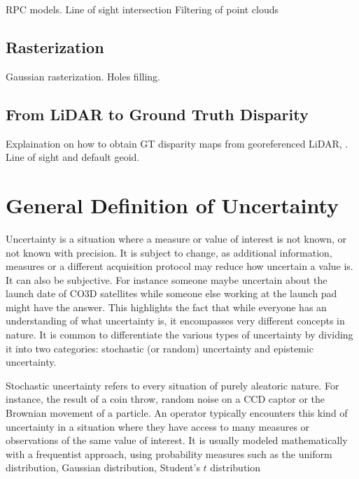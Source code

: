 RPC models. Line of sight intersection
Filtering of point clouds

\subsection{Rasterization}
Gaussian rasterization. Holes filling.  

\subsection{From LiDAR to Ground Truth Disparity}
Explaination on how to obtain GT disparity maps from georeferenced LiDAR, \cite{cournet_ground_2020}. Line of sight and default geoid. 

\section{General Definition of Uncertainty}
Uncertainty is a situation where a measure or value of interest is not known, or not known with precision. It is subject to change, as additional information, measures or a different acquisition protocol may reduce how uncertain a value is. It can also be subjective. For instance someone maybe uncertain about the launch date of CO3D satellites while someone else working at the launch pad might have the answer. This highlights the fact that while everyone has an understanding of what uncertainty is, it encompasses very different concepts in nature. It is common to differentiate the various types of uncertainty by dividing it into two categories: stochastic (or random) uncertainty and epistemic uncertainty.

Stochastic uncertainty refers to every situation of purely aleatoric nature. For instance, the result of a coin throw, random noise on a CCD captor or the Brownian movement of a particle. An operator typically encounters this kind of uncertainty in a situation where they have access to many measures or observations of the same value of interest. It is usually modeled mathematically with a frequentist approach, using probability measures such as the uniform distribution, Gaussian distribution, Student's $t$ distribution \etc 

